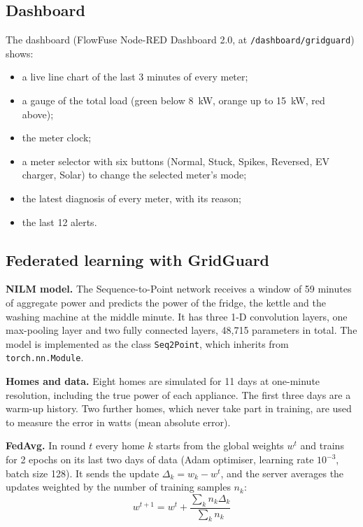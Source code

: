 \documentclass[12pt,a4paper,oneside]{report}
\begin{document}
\subsection{Dashboard}

The dashboard (FlowFuse Node-RED Dashboard 2.0, at \texttt{/dashboard/gridguard}) shows:

\begin{itemize}
\item a live line chart of the last 3 minutes of every meter;
\item a gauge of the total load (green below 8~kW, orange up to 15~kW, red above);
\item the meter clock;
\item a meter selector with six buttons (Normal, Stuck, Spikes, Reversed, EV charger, Solar) to change the selected meter's mode;
\item the latest diagnosis of every meter, with its reason;
\item the last 12 alerts.
\end{itemize}

\subsection{Federated learning with GridGuard}

\textbf{NILM model.} The Sequence-to-Point network \cite{s2p} receives a window of 59 minutes of aggregate power and predicts the power of the fridge, the kettle and the washing machine at the middle minute. It has three 1-D convolution layers, one max-pooling layer and two fully connected layers, 48,715 parameters in total. The model is implemented as the class \texttt{Seq2Point}, which inherits from \texttt{torch.nn.Module}.

\textbf{Homes and data.} Eight homes are simulated for 11 days at one-minute resolution, including the true power of each appliance. The first three days are a warm-up history. Two further homes, which never take part in training, are used to measure the error in watts (mean absolute error).

\textbf{FedAvg.} In round $t$ every home $k$ starts from the global weights $w^t$ and trains for 2 epochs on its last two days of data (Adam optimiser, learning rate $10^{-3}$, batch size 128). It sends the update $\Delta_k = w_k - w^t$, and the server averages the updates weighted by the number of training samples $n_k$:
\begin{equation}
w^{t+1} = w^t + \frac{\sum_k n_k \Delta_k}{\sum_k n_k}
\end{equation}
\end{document}
